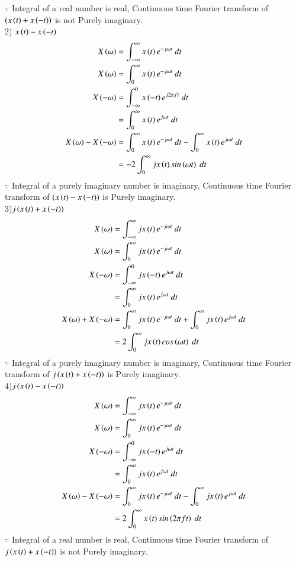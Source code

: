 \documentclass[journal,12pt,twocolumn]{IEEEtran}
\theoremstyle{remark}
\begin{document}
$\because$ Integral of a real number is real, Continuous time Fourier transform of $\left(x\left(t\right) + x\left(-t\right)\right)$ is not Purely imaginary.\\
2) $x\left(t\right) - x\left(-t\right)$
\begin{align}
   X\brak{\omega}&=\int_{-\infty}^{\infty}x\brak{t} e^{-j \omega t} \ dt\\
   X\brak{\omega }&= \int_{0}^{\infty}x\brak{t} e^{-j\omega t} \ dt\\
   X\brak{-\omega}&= \int_{-\infty}^{0}x\brak{-t} e^{j2 \pi ft} \ dt\\
 &=\int_{0}^{\infty}x\brak{t} e^{j\omega t} \ dt\\
 X\brak{\omega}-X\brak{-\omega}&= \int_{0}^{\infty}x\brak{t} e^{-j\omega t} \ dt-\int_{0}^{\infty}x\brak{t} e^{j \omega t} \ dt\\
 &= -2 \int_{0}^{\infty}j x\brak{t} sin\brak{\omega t} \ dt
\end{align}
$\because$ Integral of a purely imaginary number is imaginary, Continuous time Fourier transform of $\left(x\left(t\right) - x\left(-t\right)\right)$ is Purely imaginary.\\
3)$j\left(x\left(t\right) + x\left(-t\right)\right)$
\begin{align}
   X\brak{\omega}&=\int_{-\infty}^{\infty} j x\brak{t} e^{-j\omega t} \ dt\\
   X\brak{\omega}&= \int_{0}^{\infty} j x\brak{t} e^{-j \omega t} \ dt\\
   X\brak{-\omega}&= \int_{-\infty}^{0} j x\brak{-t} e^{j\omega t} \ dt\\
 &=\int_{0}^{\infty} j x\brak{t} e^{j\omega t} \ dt\\
 X\brak{\omega}+X\brak{-\omega}&= \int_{0}^{\infty} j x\brak{t} e^{-j\omega t} \ dt+\int_{0}^{\infty} j x\brak{t} e^{j\omega t} \ dt\\
 &= 2 \int_{0}^{\infty} j x\brak{t} cos\brak{\omega t} \ dt
\end{align}
$\because$ Integral of a purely imaginary number is imaginary, Continuous time Fourier transform of $j\left(x\left(t\right) + x\left(-t\right)\right)$ is Purely imaginary.\\
4)$j\left(x\left(t\right) - x\left(-t\right)\right)$
\begin{align}
   X\brak{\omega}&=\int_{-\infty}^{\infty} j x\brak{t} e^{-j\omega t} \ dt\\
   X\brak{\omega }&= \int_{0}^{\infty} j x\brak{t} e^{-j\omega t} \ dt\\
   X\brak{-\omega }&= \int_{-\infty}^{0} j x\brak{-t} e^{j\omega t} \ dt\\
 &=\int_{0}^{\infty} j x\brak{t} e^{j\omega t} \ dt\\
 X\brak{\omega }-X\brak{-\omega }&= \int_{0}^{\infty} j x\brak{t} e^{-j\omega t} \ dt-\int_{0}^{\infty} j x\brak{t} e^{j\omega t} \ dt\\
 &= 2 \int_{0}^{\infty}  x\brak{t} sin\brak{2 \pi ft} \ dt
\end{align}
$\because$ Integral of a real number is real, Continuous time Fourier transform of $j\left(x\left(t\right) + x\left(-t\right)\right)$ is not Purely imaginary.\\
\end{document}
